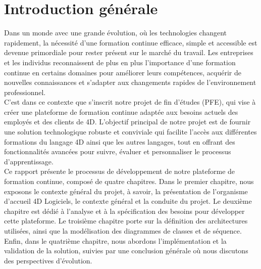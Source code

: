 \chapter*{Introduction générale}


Dans un monde avec une grande évolution, où les technologies changent rapidement, la nécessité d'une formation continue efficace, simple et accessible est devenue primordiale pour rester présent sur le marché du travail. Les entreprises et les individus reconnaissent de plus en plus l’importance d'une formation continue en certains domaines pour améliorer leurs compétences, acquérir de nouvelles connaissances et s'adapter aux changements rapides de l'environnement professionnel.\\

C'est dans ce contexte que s'inscrit notre projet de fin d'études (PFE), qui vise à créer une plateforme de formation continue adaptée aux besoins actuels des employés et des clients de 4D. L’objectif principal de notre projet est de fournir une solution technologique robuste et conviviale qui facilite l'accès aux différentes formations du langage 4D ainsi que les autres langages, tout en offrant des fonctionnalités avancées pour suivre, évaluer et personnaliser le processus d'apprentissage.\\

Ce rapport présente le processus de développement de notre plateforme de formation continue, composé de quatre chapitres. Dans le premier chapitre, nous exposons le contexte général du projet, à savoir, la présentation de l’organisme d’accueil 4D Logiciels, le contexte général et la conduite du projet. Le deuxième chapitre est dédié à l’analyse et à la spécification des besoins pour développer cette plateforme. Le troisième chapitre porte sur la définition des architectures utilisées, ainsi que la modélisation des diagrammes de classes et de séquence. Enfin, dans le quatrième chapitre, nous abordons l’implémentation et la validation de la solution, suivies par une conclusion générale où nous discutons des perspectives d’évolution.\\

